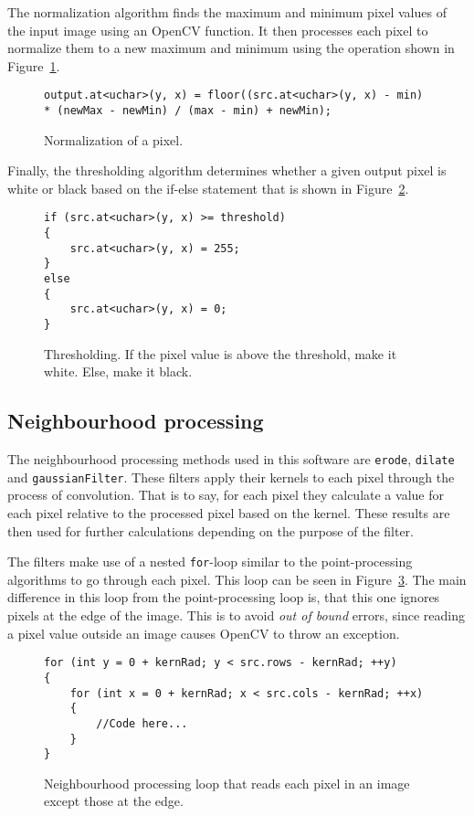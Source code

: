 The normalization algorithm finds the maximum and minimum pixel values of the input image using an OpenCV function. It then processes each pixel to normalize them to a new maximum and minimum using the operation shown in Figure~\ref{fig:normalize}.

\begin{figure}
\begin{lstlisting}
output.at<uchar>(y, x) = floor((src.at<uchar>(y, x) - min) * (newMax - newMin) / (max - min) + newMin);
\end{lstlisting}
\caption{Normalization of a pixel. \label{fig:normalize}}
\end{figure} 

Finally, the thresholding algorithm determines whether a given output pixel is white or black based on the if-else statement that is shown in Figure~\ref{fig:threshold}.

\begin{figure}
\begin{lstlisting}
if (src.at<uchar>(y, x) >= threshold)
{
	src.at<uchar>(y, x) = 255;
}
else
{
	src.at<uchar>(y, x) = 0;
}
\end{lstlisting}
\caption{Thresholding. If the pixel value is above the threshold, make it white. Else, make it black.\label{fig:threshold}}
\end{figure}

\subsection{Neighbourhood processing}
The neighbourhood processing methods used in this software are \texttt{erode}, \texttt{dilate} and \texttt{gaussianFilter}. These filters apply their kernels to each pixel through the process of convolution. That is to say, for each pixel they calculate a value for each pixel relative to the processed pixel based on the kernel. These results are then used for further calculations depending on the purpose of the filter.

The filters make use of a nested \texttt{for}-loop similar to the point-processing algorithms to go through each pixel. This loop can be seen in Figure~\ref{fig:neighbourhoodForLoop}. The main difference in this loop from the point-processing loop is, that this one ignores pixels at the edge of the image. This is to avoid \textit{out of bound} errors, since reading a pixel value outside an image causes OpenCV to throw an exception.

\begin{figure}
\begin{lstlisting}
for (int y = 0 + kernRad; y < src.rows - kernRad; ++y)
{
	for (int x = 0 + kernRad; x < src.cols - kernRad; ++x)
	{
		//Code here...
	}
}
\end{lstlisting}
\caption{Neighbourhood processing loop that reads each pixel in an image except those at the edge. \label{fig:neighbourhoodForLoop}}
\end{figure}

